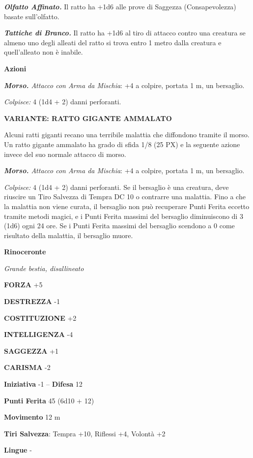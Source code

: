 \begin{multicols}{2}
	\textit{\textbf{Olfatto Affinato.}} Il ratto ha +1d6 alle prove di Saggezza (Consapevolezza) basate sull'olfatto.

	\textit{\textbf{Tattiche di Branco.}} Il ratto ha +1d6 al tiro di attacco contro una creatura se almeno uno degli alleati del ratto si trova entro 1 metro dalla creatura e quell'alleato non è inabile.

	\textbf{Azioni}

	\textit{\textbf{Morso.} Attacco con Arma da Mischia}: +4 a colpire, portata 1 m, un bersaglio.

	\textit{Colpisce:} 4 (1d4 + 2) danni perforanti.

	\textbf{VARIANTE: RATTO GIGANTE AMMALATO}

	Alcuni ratti giganti recano una terribile malattia che diffondono tramite il morso. Un ratto gigante ammalato ha grado di sfida 1/8 (25 PX) e la seguente azione invece del suo normale attacco di morso.

	\textit{\textbf{Morso.} Attacco con Arma da Mischia}: +4 a colpire, portata 1 m, un bersaglio.

	\textit{Colpisce:} 4 (1d4 + 2) danni perforanti. Se il bersaglio è una creatura, deve riuscire un Tiro Salvezza di Tempra DC 10 o contrarre una malattia. Fino a che la malattia non viene curata, il bersaglio non può recuperare Punti Ferita eccetto tramite metodi magici, e i Punti Ferita massimi del bersaglio diminuiscono di 3 (1d6) ogni 24 ore. Se i Punti Ferita massimi del bersaglio scendono a 0 come risultato della malattia, il bersaglio muore.

	\medskip\textbf{Rinoceronte}

	\textit{Grande bestia, disallineato}

	\textbf{FORZA} +5

	\textbf{DESTREZZA} -1

	\textbf{COSTITUZIONE} +2

	\textbf{INTELLIGENZA} -4

	\textbf{SAGGEZZA} +1

	\textbf{CARISMA} -2

	\textbf{Iniziativa} -1 -- \textbf{Difesa} 12

	\textbf{Punti Ferita} 45 (6d10 + 12)

	\textbf{Movimento} 12 m

	\textbf{Tiri Salvezza}: Tempra +10, Riflessi +4, Volontà +2

	\textbf{Lingue} -


\end{multicols}
